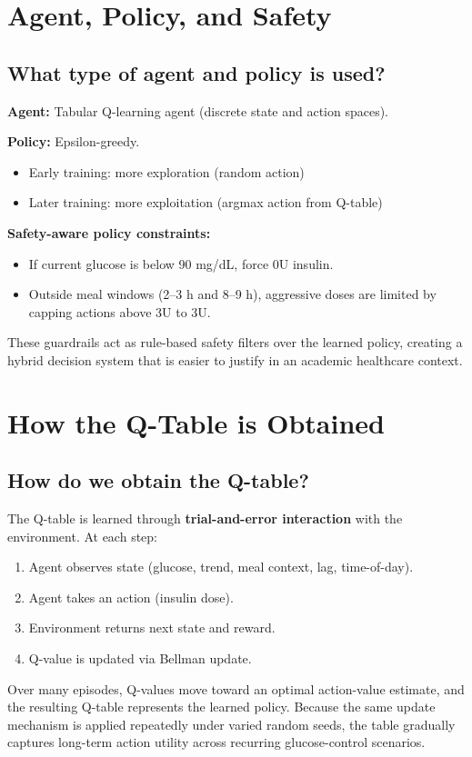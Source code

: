\documentclass[conference]{IEEEtran}
\begin{document}
\section{Agent, Policy, and Safety}
\subsection{What type of agent and policy is used?}
\textbf{Agent:} Tabular Q-learning agent (discrete state and action spaces).

\textbf{Policy:} Epsilon-greedy.
\begin{itemize}
    \item Early training: more exploration (random action)
    \item Later training: more exploitation (argmax action from Q-table)
\end{itemize}

\textbf{Safety-aware policy constraints:}
\begin{itemize}
    \item If current glucose is below 90 mg/dL, force 0U insulin.
    \item Outside meal windows (2--3 h and 8--9 h), aggressive doses are limited by capping actions above 3U to 3U.
\end{itemize}
These guardrails act as rule-based safety filters over the learned policy, creating a hybrid decision system that is easier to justify in an academic healthcare context.

\section{How the Q-Table is Obtained}
\subsection{How do we obtain the Q-table?}
The Q-table is learned through \textbf{trial-and-error interaction} with the environment.
At each step:
\begin{enumerate}
    \item Agent observes state (glucose, trend, meal context, lag, time-of-day).
    \item Agent takes an action (insulin dose).
    \item Environment returns next state and reward.
    \item Q-value is updated via Bellman update.
\end{enumerate}
Over many episodes, Q-values move toward an optimal action-value estimate, and the resulting Q-table represents the learned policy.
Because the same update mechanism is applied repeatedly under varied random seeds, the table gradually captures long-term action utility across recurring glucose-control scenarios.
\end{document}
